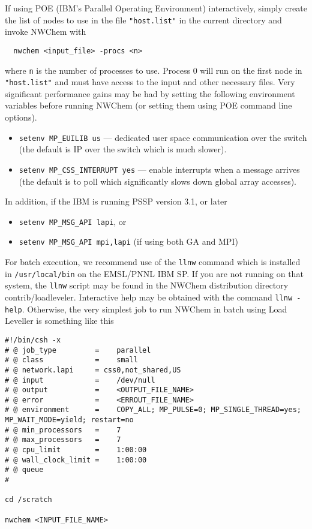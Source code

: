 If using POE (IBM's Parallel Operating Environment) interactively,
simply create the list of nodes to use in the file \verb+"host.list"+ in
the current directory and invoke NWChem with
\begin{verbatim}
  nwchem <input_file> -procs <n>
\end{verbatim}
where \verb+n+ is the number of processes to use.  Process 0 will run
on the first node in \verb+"host.list"+ and must have access to the
input and other necessary files.  Very significant performance gains
may be had by setting the following environment variables before
running NWChem (or setting them using POE command line options).
\begin{itemize}
\item \verb+setenv MP_EUILIB us+ --- dedicated user space
  communication over the switch (the default is IP over the switch
  which is much slower).
\item \verb+setenv MP_CSS_INTERRUPT yes+ --- enable interrupts when a 
  message arrives (the default is to poll which significantly slows
  down global array accesses).
\end{itemize}
In addition, if the IBM is running PSSP version 3.1, or later
\begin{itemize}
\item \verb+setenv MP_MSG_API lapi+, or 
\item \verb+setenv MP_MSG_API mpi,lapi+ (if using both GA and MPI) 
\end{itemize}

For batch execution, we recommend use of the \verb+llnw+ command which
is installed in \verb+/usr/local/bin+ on the EMSL/PNNL IBM SP.  If you 
are not running on that system, the \verb+llnw+ script may be found in
the NWChem distribution directory contrib/loadleveler.
Interactive help may be obtained with the command \verb+llnw -help+.
Otherwise, the very simplest job to run NWChem in batch using Load
Leveller is something like this
\begin{verbatim}
#!/bin/csh -x
# @ job_type         =    parallel
# @ class            =    small
# @ network.lapi     = css0,not_shared,US
# @ input            =    /dev/null
# @ output           =    <OUTPUT_FILE_NAME>
# @ error            =    <ERROUT_FILE_NAME>
# @ environment      =    COPY_ALL; MP_PULSE=0; MP_SINGLE_THREAD=yes; MP_WAIT_MODE=yield; restart=no
# @ min_processors   =    7
# @ max_processors   =    7
# @ cpu_limit        =    1:00:00
# @ wall_clock_limit =    1:00:00
# @ queue
#

cd /scratch

nwchem <INPUT_FILE_NAME>
\end{verbatim}

